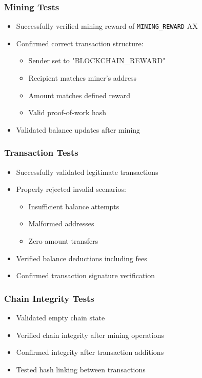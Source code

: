 \documentclass[12pt]{article}
\begin{document}
\subsubsection{Mining Tests}
\begin{itemize}
\item Successfully verified mining reward of \texttt{MINING\_REWARD} AX
\item Confirmed correct transaction structure:
    \begin{itemize}
    \item Sender set to "BLOCKCHAIN\_REWARD"
    \item Recipient matches miner's address
    \item Amount matches defined reward
    \item Valid proof-of-work hash
    \end{itemize}
\item Validated balance updates after mining
\end{itemize}

\subsubsection{Transaction Tests}
\begin{itemize}
\item Successfully validated legitimate transactions
\item Properly rejected invalid scenarios:
    \begin{itemize}
    \item Insufficient balance attempts
    \item Malformed addresses
    \item Zero-amount transfers
    \end{itemize}
\item Verified balance deductions including fees
\item Confirmed transaction signature verification
\end{itemize}

\subsubsection{Chain Integrity Tests}
\begin{itemize}
\item Validated empty chain state
\item Verified chain integrity after mining operations
\item Confirmed integrity after transaction additions
\item Tested hash linking between transactions
\end{itemize}
\end{document}
